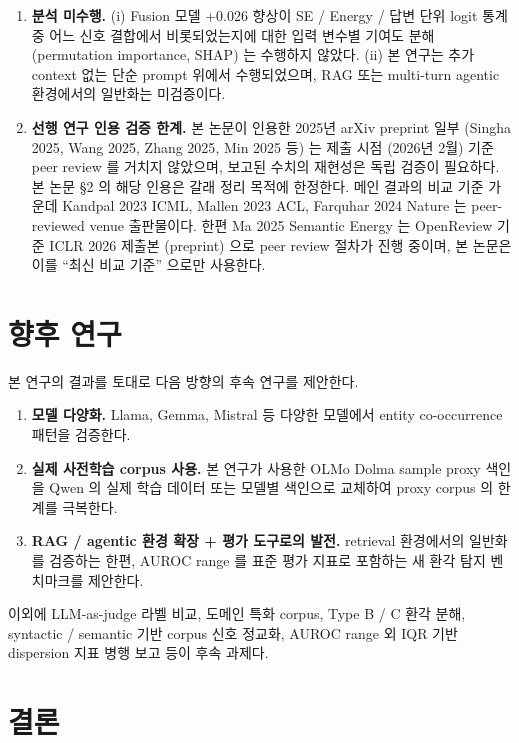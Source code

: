 \documentclass[oneside,ko,under]{snuthesis}
\begin{document}
\begin{enumerate}
    \item \textbf{분석 미수행.} (i) Fusion 모델 +0.026 향상이 SE / Energy / 답변 단위 logit 통계 중 어느 신호 결합에서 비롯되었는지에 대한 입력 변수별 기여도 분해 (permutation importance, SHAP) 는 수행하지 않았다. (ii) 본 연구는 추가 context 없는 단순 prompt 위에서 수행되었으며, RAG 또는 multi-turn agentic 환경에서의 일반화는 미검증이다.
    \item \textbf{선행 연구 인용 검증 한계.} 본 논문이 인용한 2025년 arXiv preprint 일부 (Singha 2025\cite{singha2025eclipse}, Wang 2025\cite{wang2025seredeep}, Zhang 2025\cite{zhang2025corpus}, Min 2025\cite{qucorag} 등) 는 제출 시점 (2026년 2월) 기준 peer review 를 거치지 않았으며, 보고된 수치의 재현성은 독립 검증이 필요하다. 본 논문 §2 의 해당 인용은 갈래 정리 목적에 한정한다. 메인 결과의 비교 기준 가운데 Kandpal 2023 ICML\cite{kandpal2023longtail}, Mallen 2023 ACL\cite{mallen2023whennot}, Farquhar 2024 Nature\cite{farquhar2024} 는 peer-reviewed venue 출판물이다. 한편 Ma 2025\cite{ma2025} Semantic Energy 는 OpenReview 기준 ICLR 2026 제출본 (preprint) 으로 peer review 절차가 진행 중이며, 본 논문은 이를 ``최신 비교 기준'' 으로만 사용한다.
\end{enumerate}

\section{향후 연구}

본 연구의 결과를 토대로 다음 방향의 후속 연구를 제안한다.
\begin{enumerate}
    \item \textbf{모델 다양화.} Llama, Gemma, Mistral 등 다양한 모델에서 entity co-occurrence 패턴을 검증한다.
    \item \textbf{실제 사전학습 corpus 사용.} 본 연구가 사용한 OLMo Dolma sample proxy 색인을 Qwen 의 실제 학습 데이터 또는 모델별 색인으로 교체하여 proxy corpus 의 한계를 극복한다.
    \item \textbf{RAG / agentic 환경 확장 + 평가 도구로의 발전.} retrieval 환경에서의 일반화를 검증하는 한편, AUROC range 를 표준 평가 지표로 포함하는 새 환각 탐지 벤치마크를 제안한다.
\end{enumerate}

이외에 LLM-as-judge 라벨 비교, 도메인 특화 corpus, Type B / C 환각 분해, syntactic / semantic 기반 corpus 신호 정교화, AUROC range 외 IQR 기반 dispersion 지표 병행 보고 등이 후속 과제다.

\section{결론}
\end{document}
